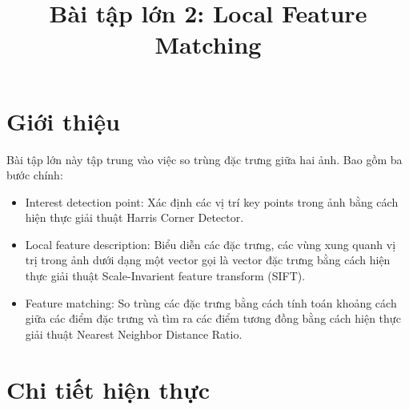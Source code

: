 \documentclass[11pt]{article}
\date{}
\title{\vspace{-1cm}Bài tập lớn 2: Local Feature Matching}
\begin{document}
\maketitle
\vspace{-2cm}
\thispagestyle{fancy}

\section*{Giới thiệu}
Bài tập lớn này tập trung vào việc so trùng đặc trưng giữa hai ảnh. Bao gồm ba bước chính:
\begin{itemize}
    \item Interest detection point: Xác định các vị trí key points trong ảnh bằng cách hiện thực giải thuật Harris Corner Detector.
    \item Local feature description: Biểu diễn các đặc trưng, các vùng xung quanh vị trị trong ảnh dưới dạng một vector gọi là vector đặc trưng bằng cách hiện thực giải thuật Scale-Invarient feature transform (SIFT).
    \item Feature matching: So trùng các đặc trưng bằng cách tính toán khoảng cách giữa các điểm đặc trưng và tìm ra các điểm tương đồng bằng cách hiện thực giải thuật Nearest Neighbor Distance Ratio.
\end{itemize}

\section*{Chi tiết hiện thực}
\end{document}
